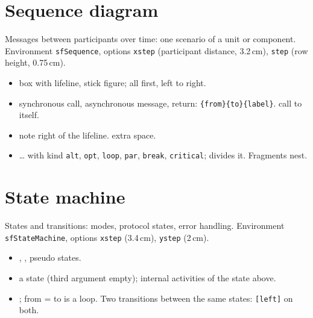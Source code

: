 \section{Sequence diagram}

Messages between participants over time: one scenario of a unit or component. Environment \texttt{sfSequence}, options \texttt{xstep} (participant distance, 3.2\,cm), \texttt{step} (row height, 0.75\,cm).

\begin{itemize}
  \item {} box with lifeline,  stick figure; all first, left to right.
  \item {} synchronous call,  asynchronous message,  return: \texttt{\{from\}\{to\}\{label\}}.  call to itself.
  \item {} note right of the lifeline.  extra space.
  \item {} …  with kind \texttt{alt}, \texttt{opt}, \texttt{loop}, \texttt{par}, \texttt{break}, \texttt{critical};  divides it. Fragments nest.
\end{itemize}


\section{State machine}

States and transitions: modes, protocol states, error handling. Environment \texttt{sfStateMachine}, options \texttt{xstep} (3.4\,cm), \texttt{ystep} (2\,cm).

\begin{itemize}
  \item {}, ,  pseudo states.
  \item {} a state (third argument empty);  internal activities of the state above.
  \item {}; from = to is a loop. Two transitions between the same states: \texttt{[left]} on both.
\end{itemize}


